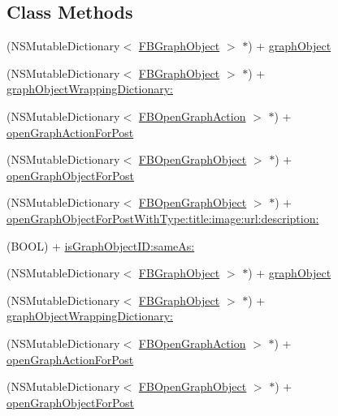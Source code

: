 \subsection*{Class Methods}
\begin{DoxyCompactItemize}
\item 
(N\+S\+Mutable\+Dictionary$<$ \hyperlink{interfaceFBGraphObject}{F\+B\+Graph\+Object} $>$ $\ast$) + \hyperlink{interfaceFBGraphObject_af260be1d9411288632bf883f84838853}{graph\+Object}
\item 
(N\+S\+Mutable\+Dictionary$<$ \hyperlink{interfaceFBGraphObject}{F\+B\+Graph\+Object} $>$ $\ast$) + \hyperlink{interfaceFBGraphObject_af840ca586bf7b7ecf55d97c0e780f2cd}{graph\+Object\+Wrapping\+Dictionary\+:}
\item 
(N\+S\+Mutable\+Dictionary$<$ \hyperlink{protocolFBOpenGraphAction-p}{F\+B\+Open\+Graph\+Action} $>$ $\ast$) + \hyperlink{interfaceFBGraphObject_a88f02cdbd7bbafe3c836b9bcd731860d}{open\+Graph\+Action\+For\+Post}
\item 
(N\+S\+Mutable\+Dictionary$<$ \hyperlink{protocolFBOpenGraphObject-p}{F\+B\+Open\+Graph\+Object} $>$ $\ast$) + \hyperlink{interfaceFBGraphObject_a79fab85a97be10dc0d5bf6febcc848f4}{open\+Graph\+Object\+For\+Post}
\item 
(N\+S\+Mutable\+Dictionary$<$ \hyperlink{protocolFBOpenGraphObject-p}{F\+B\+Open\+Graph\+Object} $>$ $\ast$) + \hyperlink{interfaceFBGraphObject_ad8c6af9938313eafd419342903a15f25}{open\+Graph\+Object\+For\+Post\+With\+Type\+:title\+:image\+:url\+:description\+:}
\item 
(B\+O\+OL) + \hyperlink{interfaceFBGraphObject_a62b9fd3318de27294b10860c9a62160c}{is\+Graph\+Object\+I\+D\+:same\+As\+:}
\item 
(N\+S\+Mutable\+Dictionary$<$ \hyperlink{interfaceFBGraphObject}{F\+B\+Graph\+Object} $>$ $\ast$) + \hyperlink{interfaceFBGraphObject_af260be1d9411288632bf883f84838853}{graph\+Object}
\item 
(N\+S\+Mutable\+Dictionary$<$ \hyperlink{interfaceFBGraphObject}{F\+B\+Graph\+Object} $>$ $\ast$) + \hyperlink{interfaceFBGraphObject_af840ca586bf7b7ecf55d97c0e780f2cd}{graph\+Object\+Wrapping\+Dictionary\+:}
\item 
(N\+S\+Mutable\+Dictionary$<$ \hyperlink{protocolFBOpenGraphAction-p}{F\+B\+Open\+Graph\+Action} $>$ $\ast$) + \hyperlink{interfaceFBGraphObject_a88f02cdbd7bbafe3c836b9bcd731860d}{open\+Graph\+Action\+For\+Post}
\item 
(N\+S\+Mutable\+Dictionary$<$ \hyperlink{protocolFBOpenGraphObject-p}{F\+B\+Open\+Graph\+Object} $>$ $\ast$) + \hyperlink{interfaceFBGraphObject_a79fab85a97be10dc0d5bf6febcc848f4}{open\+Graph\+Object\+For\+Post}

\end{DoxyCompactItemize}

